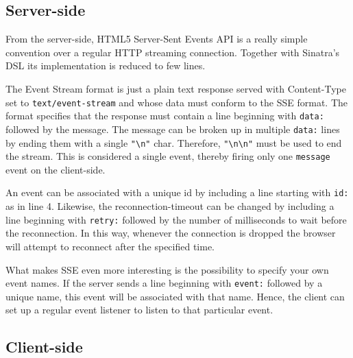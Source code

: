 \subsection*{Server-side}

From the server-side, HTML5 Server-Sent Events API is a really simple convention over a regular HTTP streaming connection. Together with Sinatra's DSL its implementation is reduced to few lines.


The Event Stream format is just a plain text response served with Content-Type set to \texttt{text/event-stream} and whose data must conform to the SSE format. The format specifies that the response must contain a line beginning with \texttt{data:} followed by the message. The message can be broken up in multiple \texttt{data:} lines by ending them with a single \texttt{"\texttt{\textbackslash n}"} char. Therefore, \texttt{"\textbackslash n\textbackslash n"} must be used to end the stream. This is considered a single event, thereby firing only one \texttt{message} event on the client-side.

An event can be associated with a unique id by including a line starting with \texttt{id:} as in line 4. Likewise, the reconnection-timeout can be changed by including a line beginning with \texttt{retry:} followed by the number of milliseconds to wait before the reconnection. In this way, whenever the connection is dropped the browser will attempt to reconnect after the specified time.

What makes SSE even more interesting is the possibility to specify your own event names. If the server sends a line beginning with \texttt{event:} followed by a unique name, this event will be associated with that name. Hence, the client can set up a regular event listener to listen to that particular event.

\subsection*{Client-side}

